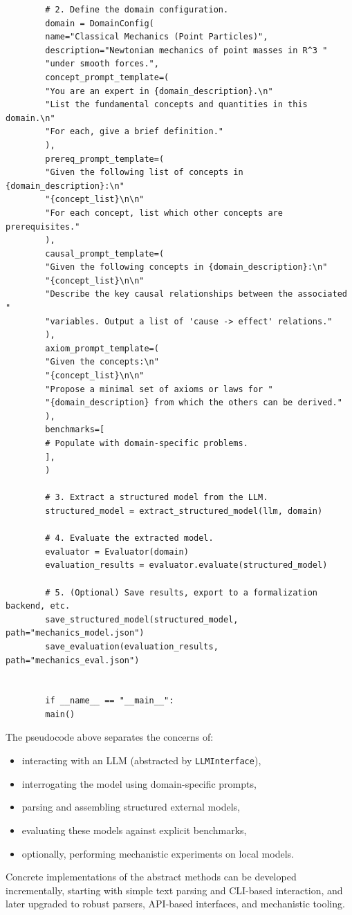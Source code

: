 \documentclass[11pt]{article}
\begin{document}
\begin{verbatim}
		# 2. Define the domain configuration.
		domain = DomainConfig(
		name="Classical Mechanics (Point Particles)",
		description="Newtonian mechanics of point masses in R^3 "
		"under smooth forces.",
		concept_prompt_template=(
		"You are an expert in {domain_description}.\n"
		"List the fundamental concepts and quantities in this domain.\n"
		"For each, give a brief definition."
		),
		prereq_prompt_template=(
		"Given the following list of concepts in {domain_description}:\n"
		"{concept_list}\n\n"
		"For each concept, list which other concepts are prerequisites."
		),
		causal_prompt_template=(
		"Given the following concepts in {domain_description}:\n"
		"{concept_list}\n\n"
		"Describe the key causal relationships between the associated "
		"variables. Output a list of 'cause -> effect' relations."
		),
		axiom_prompt_template=(
		"Given the concepts:\n"
		"{concept_list}\n\n"
		"Propose a minimal set of axioms or laws for "
		"{domain_description} from which the others can be derived."
		),
		benchmarks=[
		# Populate with domain-specific problems.
		],
		)
		
		# 3. Extract a structured model from the LLM.
		structured_model = extract_structured_model(llm, domain)
		
		# 4. Evaluate the extracted model.
		evaluator = Evaluator(domain)
		evaluation_results = evaluator.evaluate(structured_model)
		
		# 5. (Optional) Save results, export to a formalization backend, etc.
		save_structured_model(structured_model, path="mechanics_model.json")
		save_evaluation(evaluation_results, path="mechanics_eval.json")
		
		
		if __name__ == "__main__":
		main()
	\end{verbatim}
	
	The pseudocode above separates the concerns of:
	\begin{itemize}[nosep]
		\item interacting with an LLM (abstracted by \texttt{LLMInterface}),
		\item interrogating the model using domain-specific prompts,
		\item parsing and assembling structured external models,
		\item evaluating these models against explicit benchmarks,
		\item optionally, performing mechanistic experiments on local models.
	\end{itemize}
	Concrete implementations of the abstract methods can be developed incrementally, starting with simple text parsing and CLI-based interaction, and later upgraded to robust parsers, API-based interfaces, and mechanistic tooling.
	
\end{document}
